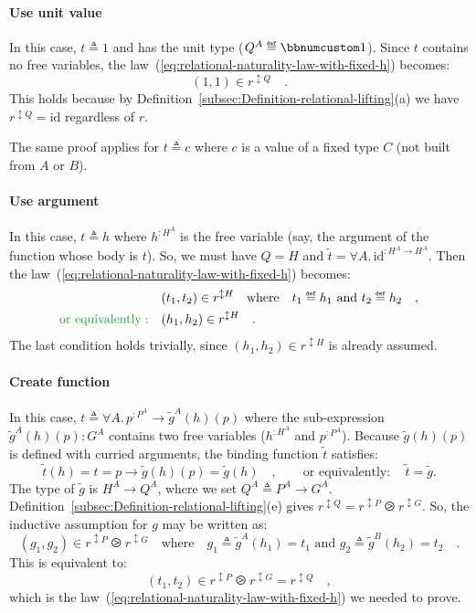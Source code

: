 \paragraph{Use unit value}

In this case, $t\triangleq1$ and has the unit type ($Q^{A}\triangleq\bbnum 1$).
Since $t$ contains no free variables, the law~(\ref{eq:relational-naturality-law-with-fixed-h})
becomes:
\[
(1,1)\in r^{\updownarrow Q}\quad.
\]
This holds because by Definition~\ref{subsec:Definition-relational-lifting}(a)
we have $r^{\updownarrow Q}=\text{id}$ regardless of $r$.

The same proof applies for $t\triangleq c$ where $c$ is a value
of a fixed type $C$ (not built from $A$ or $B$).

\paragraph{Use argument}

In this case, $t\triangleq h$ where $h^{:H^{A}}$ is the free variable
(say, the argument of the function whose body is $t$). So, we must
have $Q=H$ and $\tilde{t}=\forall A.\,\text{id}^{:H^{A}\rightarrow H^{A}}$.
Then the law~(\ref{eq:relational-naturality-law-with-fixed-h}) becomes:
\begin{align*}
 & (t_{1},t_{2})\in r^{\updownarrow H}\quad\text{where}\quad t_{1}\triangleq h_{1}\text{ and }t_{2}\triangleq h_{2}\quad,\\
{\color{greenunder}\text{or equivalently}:}\quad & (h_{1},h_{2})\in r^{\updownarrow H}\quad.
\end{align*}
The last condition holds trivially, since $(h_{1},h_{2})\in r^{\updownarrow H}$
is already assumed.

\paragraph{Create function}

In this case, $t\triangleq\forall A.\,p^{:P^{A}}\rightarrow\tilde{g}^{A}(h)(p)$
where the sub-expression $\tilde{g}^{A}(h)(p):G^{A}$ contains two
free variables ($h^{:H^{A}}$ and $p^{:P^{A}}$). Because $\tilde{g}(h)(p)$
is defined with curried arguments, the binding function $\tilde{t}$
satisfies:
\[
\tilde{t}(h)=t=p\rightarrow\tilde{g}(h)(p)=\tilde{g}(h)\quad,\quad\quad\text{or equivalently}:\quad\tilde{t}=\tilde{g}.
\]
The type of $\tilde{g}$ is $H^{A}\rightarrow Q^{A}$, where we set
$Q^{A}\triangleq P^{A}\rightarrow G^{A}$. Definition~\ref{subsec:Definition-relational-lifting}(e)
gives $r^{\updownarrow Q}=r^{\updownarrow P}\ogreaterthan r^{\updownarrow G}$.
So, the inductive assumption for $g$ may be written as:
\[
(g_{1},g_{2})\in r^{\updownarrow P}\ogreaterthan r^{\updownarrow G}\quad\text{where}\quad g_{1}\triangleq\tilde{g}^{A}(h_{1})=t_{1}\text{ and }g_{2}\triangleq\tilde{g}^{B}(h_{2})=t_{2}\quad.
\]
This is equivalent to:
\[
(t_{1},t_{2})\in r^{\updownarrow P}\ogreaterthan r^{\updownarrow G}=r^{\updownarrow Q}\quad,
\]
which is the law~(\ref{eq:relational-naturality-law-with-fixed-h})
we needed to prove.

